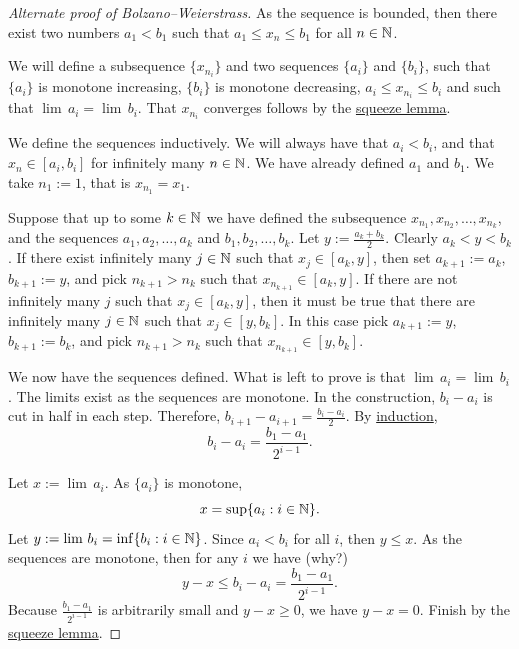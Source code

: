 \begin{proof}[Alternate proof of Bolzano--Weierstrass]
As the sequence is bounded, then there exist two numbers $a_1 < b_1$
such that $a_1 \leq x_n \leq b_1$ for all $n \in {\mathbb{N}}$.

We will define a subsequence $\{ x_{n_i} \}$ and two
sequences $\{ a_i \}$ and $\{ b_i \}$, such that
$\{ a_i \}$ is monotone increasing, $\{ b_i \}$ is monotone decreasing,
$a_i \leq x_{n_i} \leq b_i$ and such that $\lim\, a_i = \lim\, b_i$.   That
$x_{n_i}$ converges follows by the \hyperref[squeeze:lemma]{squeeze lemma}.

We define the sequences inductively.  We will always have that $a_i < b_i$,
and that $x_n \in [a_i,b_i]$ for infinitely many
$n \in {\mathbb{N}}$.
We have already defined $a_1$ and $b_1$.  We take $n_1 := 1$, that is
$x_{n_1} = x_1$.

Suppose that up to some $k \in {\mathbb{N}}$
we have defined the subsequence $x_{n_1}, x_{n_2}, \ldots,
x_{n_k}$, and the sequences $a_1,a_2,\ldots,a_k$
and $b_1,b_2,\ldots,b_k$.
Let $y := \frac{a_k+b_k}{2}$.
Clearly
$a_k < y < b_k$.  If there exist infinitely many $j \in {\mathbb{N}}$
such that $x_j \in [a_k,y]$, then set $a_{k+1} := a_k$, $b_{k+1} := y$,
and pick $n_{k+1} > n_{k}$
such that $x_{n_{k+1}} \in [a_k,y]$.  If there are not infinitely many 
$j$ such that 
$x_j \in [a_k,y]$, then it must be true that there are infinitely many $j \in
{\mathbb{N}}$ such that 
$x_j \in [y,b_k]$.  In this case pick $a_{k+1} := y$, $b_{k+1} := b_k$,
and pick $n_{k+1} > n_{k}$
such that $x_{n_{k+1}} \in [y,b_k]$.

We now have the sequences defined.  What is left to prove is that
$\lim\, a_i = \lim\, b_i$.  The limits exist as the sequences
are monotone.  In the construction,
$b_i - a_i$ is cut in half in each step.  Therefore,
$b_{i+1} - a_{i+1} = \frac{b_i-a_i}{2}$.  By
\hyperref[induction:thm]{induction},
\begin{equation*}
b_i - a_i = \frac{b_1-a_1}{2^{i-1}} .
\end{equation*}

Let $x := \lim\, a_i$.  As $\{ a_i \}$ is monotone,
\begin{equation*}
x = \sup \{ a_i : i \in {\mathbb{N}} \} .
\end{equation*}
Let $y := \lim\, b_i = \inf \{ b_i : i \in {\mathbb{N}} \}$.  Since $a_i < b_i$ for
all $i$, then $y \leq x$.
As the sequences are monotone, then
for any $i$ we have (why?)
\begin{equation*}
y-x \leq b_i-a_i = \frac{b_1-a_1}{2^{i-1}} .
\end{equation*}
Because $\frac{b_1-a_1}{2^{i-1}}$ is arbitrarily small and $y-x \geq 0$,
we have $y-x = 0$.  Finish by the \hyperref[squeeze:lemma]{squeeze lemma}.
\end{proof}

